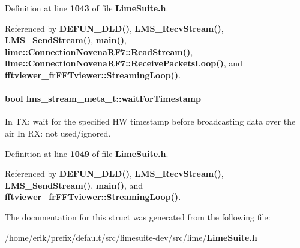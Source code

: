 Definition at line {\bf 1043} of file {\bf Lime\+Suite.\+h}.



Referenced by {\bf D\+E\+F\+U\+N\+\_\+\+D\+L\+D()}, {\bf L\+M\+S\+\_\+\+Recv\+Stream()}, {\bf L\+M\+S\+\_\+\+Send\+Stream()}, {\bf main()}, {\bf lime\+::\+Connection\+Novena\+R\+F7\+::\+Read\+Stream()}, {\bf lime\+::\+Connection\+Novena\+R\+F7\+::\+Receive\+Packets\+Loop()}, and {\bf fftviewer\+\_\+fr\+F\+F\+Tviewer\+::\+Streaming\+Loop()}.

\paragraph[{wait\+For\+Timestamp}]{\setlength{\rightskip}{0pt plus 5cm}bool lms\+\_\+stream\+\_\+meta\+\_\+t\+::wait\+For\+Timestamp}\label{structlms__stream__meta__t_a9feda8a18510dd8586805460322fe732}


In TX\+: wait for the specified HW timestamp before broadcasting data over the air In RX\+: not used/ignored. 



Definition at line {\bf 1049} of file {\bf Lime\+Suite.\+h}.



Referenced by {\bf D\+E\+F\+U\+N\+\_\+\+D\+L\+D()}, {\bf L\+M\+S\+\_\+\+Recv\+Stream()}, {\bf L\+M\+S\+\_\+\+Send\+Stream()}, {\bf main()}, and {\bf fftviewer\+\_\+fr\+F\+F\+Tviewer\+::\+Streaming\+Loop()}.



The documentation for this struct was generated from the following file\+:\begin{DoxyCompactItemize}
\item 
/home/erik/prefix/default/src/limesuite-\/dev/src/lime/{\bf Lime\+Suite.\+h}\end{DoxyCompactItemize}
